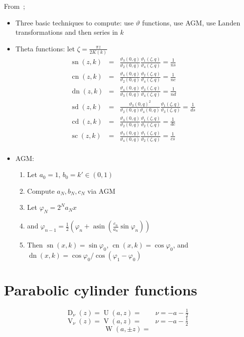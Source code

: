 \documentclass[10pt,dvipdfmx,letterpaper,twoside]{article}
\DeclareMathOperator{\asin}{asin}
\let\O=\operatorname
\newenvironment{implementation}{\noindent\begin{framed}}{\end{framed}}
\let\theta=\vartheta
\let\phi=\varphi
\begin{document}
\begin{implementation}
From~\cite{DLMF};
\begin{itemize}
\item Three basic techniques to compute: use $\theta$ functions, use AGM, use Landen transformations and then series in $k$
\item Theta functions: let $\zeta=\frac{\pi z}{2 K(k)}$
  \begin{eqnarray*}
  \O{sn}(z,k) &=& \frac{\theta_3(0,q)}{\theta_2(0,q)} \frac{\theta_1(\zeta,q)}{\theta_4(\zeta,q)} = \frac{1}{ns} \\
  \O{cn}(z,k) &=& \frac{\theta_4(0,q)}{\theta_2(0,q)} \frac{\theta_2(\zeta,q)}{\theta_4(\zeta,q)} = \frac{1}{nc} \\
  \O{dn}(z,k) &=& \frac{\theta_4(0,q)}{\theta_3(0,q)} \frac{\theta_3(\zeta,q)}{\theta_4(\zeta,q)} = \frac{1}{nd} \\
  \O{sd}(z,k) &=& \frac{\theta_3(0,q)^2}{\theta_2(0,q)\theta_4(0,q)} \frac{\theta_1(\zeta,q)}{\theta_3(\zeta,q)} = \frac{1}{ds} \\
  \O{cd}(z,k) &=& \frac{\theta_3(0,q)}{\theta_2(0,q)} \frac{\theta_1(\zeta,q)}{\theta_2(\zeta,q)} = \frac{1}{dc} \\
  \O{sc}(z,k) &=& \frac{\theta_3(0,q)}{\theta_4(0,q)} \frac{\theta_1(\zeta,q)}{\theta_2(\zeta,q)} = \frac{1}{cs} \\
  \end{eqnarray*}
\item AGM:
  \begin{enumerate}
  \item Let $a_0=1$, $b_0=k'\in(0,1)$
  \item Compute $a_N, b_N, c_N$ via AGM
  \item Let $\phi_N = 2^N a_N x$
  \item and $\phi_{n-1} = \tfrac12(\phi_n + \asin( \frac{c_n}{a_n} \sin \phi_n))$
  \item Then $\O{sn}(x,k)=\sin\phi_0$, $\O{cn}(x,k)=\cos\phi_0$, and $\O{dn}(x,k) = \cos\phi_0 / \cos(\phi_1-\phi_0)$
  \end{enumerate}
\end{itemize}
\end{implementation}

\section{Parabolic cylinder functions}
\[ \O{D}_\nu(z) = \O{U}(a,z) =  \qquad\nu=-a-\tfrac12\]
\[ \O{V}_\nu(z) = \O{V}(a,z) =  \qquad\nu=-a-\tfrac12\]
\[ \O{W}(a,\pm z) = \]
\end{document}
